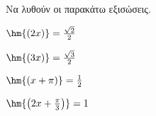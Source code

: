 Να λυθούν οι παρακάτω εξισώσεις.
\begin{alist}[leftmargin=3mm]
\begin{multicols}{2}
\item $ \hm{(2x)}=\frac{\sqrt{2}}{2} $
\item $ \hm{(3x)}=\frac{\sqrt{3}}{2} $
\item $ \hm{(x+\pi)}=\frac{1}{2} $
\item $ \hm{\left(2x+\frac{\pi}{3}\right)}=1 $
\end{multicols}
\end{alist}
